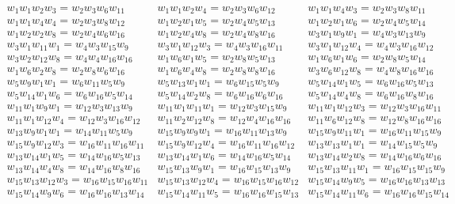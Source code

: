 \documentclass[12pt]{article}
\theoremstyle{plain}
\theoremstyle{definition}
\theoremstyle{remark}
\theoremstyle{definition}
\begin{document}
\begin{eqnarray*}
    w_{1}w_{1}w_{2}w_{3} = w_{2}w_{3}w_{6}w_{11} & w_{1}w_{1}w_{2}w_{4} = w_{2}w_{3}w_{6}w_{12} & w_{1}w_{1}w_{4}w_{3} = w_{2}w_{3}w_{8}w_{11} \\
    w_{1}w_{1}w_{4}w_{4} = w_{2}w_{3}w_{8}w_{12} & w_{1}w_{2}w_{1}w_{5} = w_{2}w_{4}w_{5}w_{13} & w_{1}w_{2}w_{1}w_{6} = w_{2}w_{4}w_{5}w_{14} \\
    w_{1}w_{2}w_{2}w_{8} = w_{2}w_{4}w_{6}w_{16} & w_{1}w_{2}w_{4}w_{8} = w_{2}w_{4}w_{8}w_{16} & w_{3}w_{1}w_{9}w_{1} = w_{4}w_{3}w_{13}w_{9} \\
    w_{3}w_{1}w_{11}w_{1} = w_{4}w_{3}w_{15}w_{9} & w_{3}w_{1}w_{12}w_{3} = w_{4}w_{3}w_{16}w_{11} & w_{3}w_{1}w_{12}w_{4} = w_{4}w_{3}w_{16}w_{12} \\
    w_{3}w_{2}w_{12}w_{8} = w_{4}w_{4}w_{16}w_{16} & w_{1}w_{6}w_{1}w_{5} = w_{2}w_{8}w_{5}w_{13} & w_{1}w_{6}w_{1}w_{6} = w_{2}w_{8}w_{5}w_{14} \\
    w_{1}w_{6}w_{2}w_{8} = w_{2}w_{8}w_{6}w_{16} & w_{1}w_{6}w_{4}w_{8} = w_{2}w_{8}w_{8}w_{16} & w_{3}w_{6}w_{12}w_{8} = w_{4}w_{8}w_{16}w_{16} \\
    w_{5}w_{9}w_{1}w_{1} = w_{6}w_{11}w_{5}w_{9} & w_{5}w_{13}w_{1}w_{1} = w_{6}w_{15}w_{5}w_{9} & w_{5}w_{14}w_{1}w_{5} = w_{6}w_{16}w_{5}w_{13} \\
    w_{5}w_{14}w_{1}w_{6} = w_{6}w_{16}w_{5}w_{14} & w_{5}w_{14}w_{2}w_{8} = w_{6}w_{16}w_{6}w_{16} & w_{5}w_{14}w_{4}w_{8} = w_{6}w_{16}w_{8}w_{16} \\
    w_{11}w_{1}w_{9}w_{1} = w_{12}w_{3}w_{13}w_{9} & w_{11}w_{1}w_{11}w_{1} = w_{12}w_{3}w_{15}w_{9} & w_{11}w_{1}w_{12}w_{3} = w_{12}w_{3}w_{16}w_{11} \\
    w_{11}w_{1}w_{12}w_{4} = w_{12}w_{3}w_{16}w_{12} & w_{11}w_{2}w_{12}w_{8} = w_{12}w_{4}w_{16}w_{16} & w_{11}w_{6}w_{12}w_{8} = w_{12}w_{8}w_{16}w_{16} \\
    w_{13}w_{9}w_{1}w_{1} = w_{14}w_{11}w_{5}w_{9} & w_{15}w_{9}w_{9}w_{1} = w_{16}w_{11}w_{13}w_{9} & w_{15}w_{9}w_{11}w_{1} = w_{16}w_{11}w_{15}w_{9} \\
    w_{15}w_{9}w_{12}w_{3} = w_{16}w_{11}w_{16}w_{11} & w_{15}w_{9}w_{12}w_{4} = w_{16}w_{11}w_{16}w_{12} & w_{13}w_{13}w_{1}w_{1} = w_{14}w_{15}w_{5}w_{9} \\
    w_{13}w_{14}w_{1}w_{5} = w_{14}w_{16}w_{5}w_{13} & w_{13}w_{14}w_{1}w_{6} = w_{14}w_{16}w_{5}w_{14} & w_{13}w_{14}w_{2}w_{8} = w_{14}w_{16}w_{6}w_{16} \\
    w_{13}w_{14}w_{4}w_{8} = w_{14}w_{16}w_{8}w_{16} & w_{15}w_{13}w_{9}w_{1} = w_{16}w_{15}w_{13}w_{9} & w_{15}w_{13}w_{11}w_{1} = w_{16}w_{15}w_{15}w_{9} \\
    w_{15}w_{13}w_{12}w_{3} = w_{16}w_{15}w_{16}w_{11} & w_{15}w_{13}w_{12}w_{4} = w_{16}w_{15}w_{16}w_{12} & w_{15}w_{14}w_{9}w_{5} = w_{16}w_{16}w_{13}w_{13} \\
    w_{15}w_{14}w_{9}w_{6} = w_{16}w_{16}w_{13}w_{14} & w_{15}w_{14}w_{11}w_{5} = w_{16}w_{16}w_{15}w_{13} & w_{15}w_{14}w_{11}w_{6} = w_{16}w_{16}w_{15}w_{14} \\
\end{eqnarray*}
\end{document}
